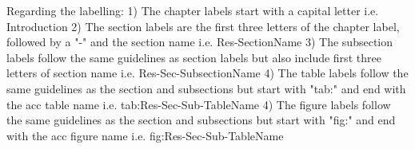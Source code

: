            Regarding the labelling:
1) The chapter labels start with a capital letter
    i.e. Introduction
2) The section labels are the first three letters of the chapter label, followed by a "-" and the section name
    i.e. Res-SectionName
3) The subsection labels follow the same guidelines as section labels but also include first three letters of section name
    i.e. Res-Sec-SubsectionName
4) The table labels follow the same guidelines as the section and subsections but start with "tab:" and end with the acc table name
    i.e. tab:Res-Sec-Sub-TableName
4) The figure labels follow the same guidelines as the section and subsections but start with "fig:" and end with the acc figure name
    i.e. fig:Res-Sec-Sub-TableName
    
            
